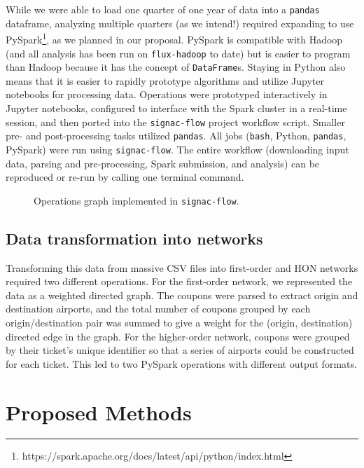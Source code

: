 \documentclass[sigconf]{acmart}
\begin{document}
While we were able to load one quarter of one year of data into a \texttt{pandas} dataframe, analyzing multiple quarters (as we intend!) required expanding to use PySpark\footnote{https://spark.apache.org/docs/latest/api/python/index.html}, as we planned in our proposal. PySpark is compatible with Hadoop (and all analysis has been run on \texttt{flux-hadoop} to date) but is easier to program than Hadoop because it has the concept of \texttt{DataFrame}s. Staying in Python also means that it is easier to rapidly prototype algorithms and utilize Jupyter notebooks for processing data. Operations were prototyped interactively in Jupyter notebooks, configured to interface with the Spark cluster in a real-time session, and then ported into the \texttt{signac-flow} project workflow script. Smaller pre- and post-processing tasks utilized \texttt{pandas}. All jobs (\texttt{bash}, Python, \texttt{pandas}, PySpark) were run using \texttt{signac-flow}. The entire workflow (downloading input data, parsing and pre-processing, Spark submission, and analysis) can be reproduced or re-run by calling one terminal command.

\begin{figure}
    \centering
    
    \caption{Operations graph implemented in \texttt{signac-flow}.}
    \label{fig:operations}
\end{figure}

\subsection{Data transformation into networks}
Transforming this data from massive CSV files into first-order and HON networks required two different operations. For the first-order network, we represented the data as a weighted directed graph. The coupons were parsed to extract origin and destination airports, and the total number of coupons grouped by each origin/destination pair was summed to give a weight for the (origin, destination) directed edge in the graph. For the higher-order network, coupons were grouped by their ticket's unique identifier so that a series of airports could be constructed for each ticket. This led to two PySpark operations with different output formats.

\section{Proposed Methods}
\end{document}

